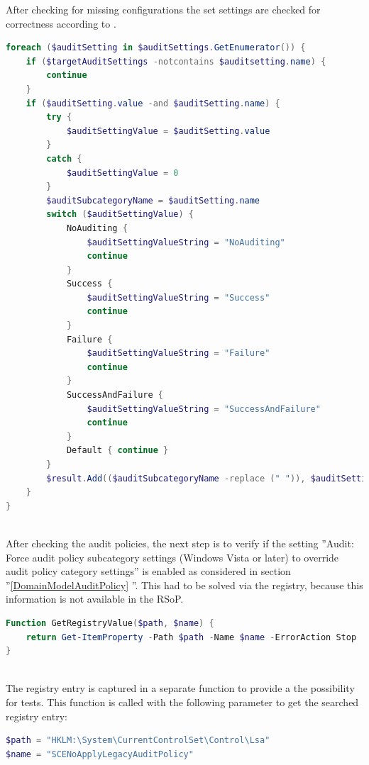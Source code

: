 \clearpage
After checking for missing configurations the set settings are checked for correctness according to .
\begin{lstlisting}[caption=GetAndCheckAuditPolicies: Get configured audit settings from RSoP, language=PowerShell]
foreach ($auditSetting in $auditSettings.GetEnumerator()) {
    if ($targetAuditSettings -notcontains $auditsetting.name) {
        continue
    }
    if ($auditSetting.value -and $auditSetting.name) {
        try {
            $auditSettingValue = $auditSetting.value
        }
        catch {
            $auditSettingValue = 0
        }
        $auditSubcategoryName = $auditSetting.name 
        switch ($auditSettingValue) {
            NoAuditing {  
                $auditSettingValueString = "NoAuditing"
                continue
            }
            Success {
                $auditSettingValueString = "Success"
                continue
            } 
            Failure {
                $auditSettingValueString = "Failure"
                continue
            }
            SuccessAndFailure {
                $auditSettingValueString = "SuccessAndFailure"
                continue
            }
            Default { continue }
        }
        $result.Add(($auditSubcategoryName -replace (" ")), $auditSettingValueString)
    }    
}
\end{lstlisting} \ \\
After checking the audit policies, the next step is to verify if the setting ''Audit: Force audit policy subcategory settings (Windows Vista or later) to override audit policy category settings'' is enabled as considered in section ''\ref{DomainModelAuditPolicy} ''. This had to be solved via the registry, because this information is not available in the RSoP.

\begin{lstlisting}[caption=GetRegistryValue,language=PowerShell]
Function GetRegistryValue($path, $name) {
    return Get-ItemProperty -Path $path -Name $name -ErrorAction Stop
}
\end{lstlisting} \ \\
The registry entry is captured in a separate function to provide a the possibility for tests. This function is called with the following parameter \cite{ForceAudit} to get the searched registry entry:

\begin{lstlisting}[language=PowerShell]
$path = "HKLM:\System\CurrentControlSet\Control\Lsa"
$name = "SCENoApplyLegacyAuditPolicy"
\end{lstlisting}


